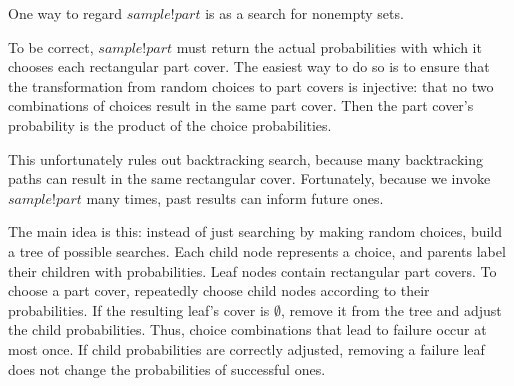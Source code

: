 One way to regard $sample!part$ is as a search for nonempty sets.

To be correct, $sample!part$ must return the actual probabilities with which it chooses each rectangular part cover.
The easiest way to do so is to ensure that the transformation from random choices to part covers is injective: that no two combinations of choices result in the same part cover.
Then the part cover's probability is the product of the choice probabilities.

This unfortunately rules out backtracking search, because many backtracking paths can result in the same rectangular cover.
Fortunately, because we invoke $sample!part$ many times, past results can inform future ones.

The main idea is this: instead of just searching by making random choices, build a tree of possible searches.
Each child node represents a choice, and parents label their children with probabilities.
Leaf nodes contain rectangular part covers.
To choose a part cover, repeatedly choose child nodes according to their probabilities.
If the resulting leaf's cover is $\emptyset$, remove it from the tree and adjust the child probabilities.
Thus, choice combinations that lead to failure occur at most once.
If child probabilities are correctly adjusted, removing a failure leaf does not change the probabilities of successful ones.

